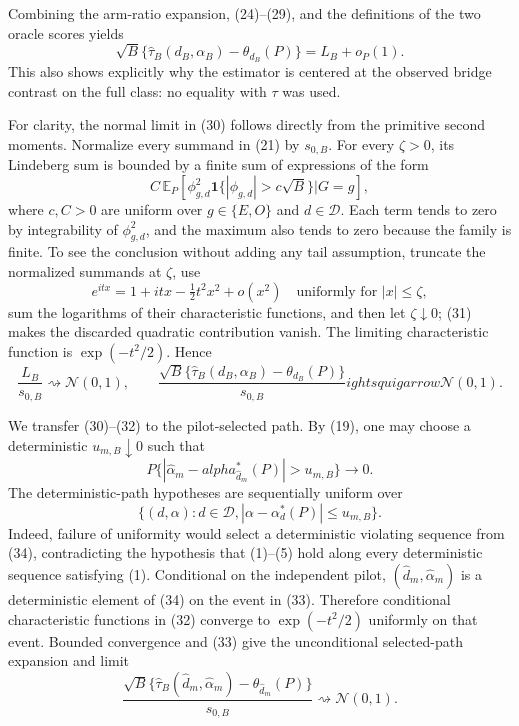 Combining the arm-ratio expansion, (24)--(29), and the definitions of the two oracle scores yields
\[
 \sqrt B\{\widehat\tau_B(d_B,\alpha_B)-\theta_{d_B}(P)\}
 =L_B+o_P(1).                                                       \tag{30}
\]
This also shows explicitly why the estimator is centered at the observed bridge contrast on the full class: no equality with \(\tau\) was used.

For clarity, the normal limit in (30) follows directly from the primitive second moments.  Normalize every summand in (21) by \(s_{0,B}\).  For every \(\zeta>0\), its Lindeberg sum is bounded by a finite sum of expressions of the form
\[
 C\,\mathbb E_P\!\left[
 \phi_{g,d}^2\mathbf1\{|\phi_{g,d}|>c\sqrt B\}
 \mathrel{\Big|}G=g\right],                                     \tag{31}
\]
where \(c,C>0\) are uniform over \(g\in\{E,O\}\) and \(d\in\mathcal D\).  Each term tends to zero by integrability of \(\phi_{g,d}^2\), and the maximum also tends to zero because the family is finite.  To see the conclusion without adding any tail assumption, truncate the normalized summands at \(\zeta\), use
\[
 e^{itx}=1+itx-\tfrac12t^2x^2+o(x^2)
 \quad\text{uniformly for }|x|\le\zeta,
\]
sum the logarithms of their characteristic functions, and then let \(\zeta\downarrow0\); (31) makes the discarded quadratic contribution vanish.  The limiting characteristic function is \(\exp(-t^2/2)\).  Hence
\[
 \frac{L_B}{s_{0,B}}\rightsquigarrow\mathcal N(0,1),
 \qquad
 \frac{\sqrt B\{\widehat\tau_B(d_B,\alpha_B)-\theta_{d_B}(P)\}}
 {s_{0,B}}
ightsquigarrow\mathcal N(0,1).                       \tag{32}
\]

We transfer (30)--(32) to the pilot-selected path.  By (19), one may choose a deterministic \(u_{m,B}\downarrow0\) such that
\[
 P\bigl\{|\widehat\alpha_m-alpha_{\widehat d_m}^*(P)|>u_{m,B}\bigr\}
 \longrightarrow0.                                                \tag{33}
\]
The deterministic-path hypotheses are sequentially uniform over
\[
 \{(d,\alpha):d\in\mathcal D,
 |\alpha-\alpha_d^*(P)|\le u_{m,B}\}.                             \tag{34}
\]
Indeed, failure of uniformity would select a deterministic violating sequence from (34), contradicting the hypothesis that (1)--(5) hold along every deterministic sequence satisfying (1).  Conditional on the independent pilot, \((\widehat d_m,\widehat\alpha_m)\) is a deterministic element of (34) on the event in (33).  Therefore conditional characteristic functions in (32) converge to \(\exp(-t^2/2)\) uniformly on that event.  Bounded convergence and (33) give the unconditional selected-path expansion and limit
\[
 \frac{\sqrt B\{\widehat\tau_B(\widehat d_m,\widehat\alpha_m)
 -\theta_{\widehat d_m}(P)\}}{s_{0,B}}
 \rightsquigarrow\mathcal N(0,1).                                \tag{35}
\]


